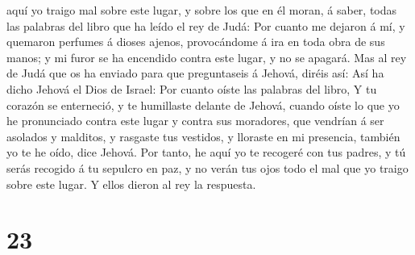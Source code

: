 aquí yo traigo mal sobre este lugar, y sobre los que en él moran, á
saber, todas las palabras del libro que ha leído el rey de Judá:
 Por cuanto me dejaron á mí, y quemaron perfumes á dioses
ajenos, provocándome á ira en toda obra de sus manos; y mi furor se ha
encendido contra este lugar, y no se apagará.  Mas al rey
de Judá que os ha enviado para que preguntaseis á Jehová, diréis así:
Así ha dicho Jehová el Dios de Israel: Por cuanto oíste las palabras del
libro,  Y tu corazón se enterneció, y te humillaste
delante de Jehová, cuando oíste lo que yo he pronunciado contra este
lugar y contra sus moradores, que vendrían á ser asolados y malditos, y
rasgaste tus vestidos, y lloraste en mi presencia, también yo te he
oído, dice Jehová.  Por tanto, he aquí yo te recogeré con
tus padres, y tú serás recogido á tu sepulcro en paz, y no verán tus
ojos todo el mal que yo traigo sobre este lugar. Y ellos dieron al rey
la respuesta.

\hypertarget{section-22}{%
\section{23}\label{section-22}}

